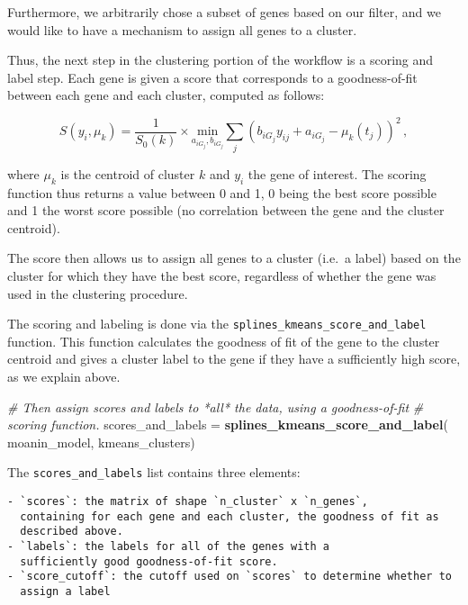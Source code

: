 \documentclass[9pt,a4paper,]{extarticle}
\newenvironment{Shaded}{\begin{snugshade}}{\end{snugshade}}
\newcommand{\CommentTok}[1]{\textcolor[rgb]{0.56,0.35,0.01}{\textit{#1}}}
\newcommand{\KeywordTok}[1]{\textcolor[rgb]{0.13,0.29,0.53}{\textbf{#1}}}
\newcommand{\NormalTok}[1]{#1}
\newcommand{\StringTok}[1]{\textcolor[rgb]{0.31,0.60,0.02}{#1}}
\begin{document}
Furthermore, we arbitrarily chose a subset of genes based on our filter, and we would
like to have a mechanism to assign all genes to a cluster.

Thus, the next step in the clustering portion of the workflow is a scoring and label step. Each gene is given a score that
corresponds to a goodness-of-fit between each gene and each cluster, computed
as follows:

\[
S(y_i, \mu_k) =  \frac{1}{S_0(k)} \times \underset{a_{iG_j}, b_{iG_j}}{\text{min}}\sum_{j}
  {\left(b_{iG_j}y_{ij} + a_{iG_j}
   - \mu_k(t_j)\right)}^2 \,,
\]

where \(\mu_k\) is the centroid of cluster \(k\) and \(y_i\) the gene of interest.
The scoring function thus returns a value between 0 and 1, 0 being the best
score possible and 1 the worst score possible (no correlation between the gene
and the cluster centroid).

The score then allows us to assign all genes to a cluster (i.e.~a label) based on the cluster for which they have the best score, regardless of whether the gene was used in the clustering procedure.

The scoring and labeling is done via the \texttt{splines\_kmeans\_score\_and\_label}
function. This function calculates the goodness of fit of the gene to the
cluster centroid and gives a cluster label to the gene if they have a sufficiently high score, as we explain above.

\begin{Shaded}
\begin{Highlighting}[]
\CommentTok{# Then assign scores and labels to *all* the data, using a goodness-of-fit}
\CommentTok{# scoring function.}
\NormalTok{scores_and_labels =}\StringTok{ }\KeywordTok{splines_kmeans_score_and_label}\NormalTok{(}
\NormalTok{    moanin_model, kmeans_clusters)}
\end{Highlighting}
\end{Shaded}

The \texttt{scores\_and\_labels} list contains three elements:

\begin{verbatim}
- `scores`: the matrix of shape `n_cluster` x `n_genes`,
  containing for each gene and each cluster, the goodness of fit as
  described above.
- `labels`: the labels for all of the genes with a
  sufficiently good goodness-of-fit score.
- `score_cutoff`: the cutoff used on `scores` to determine whether to 
  assign a label
\end{verbatim}
\end{document}
